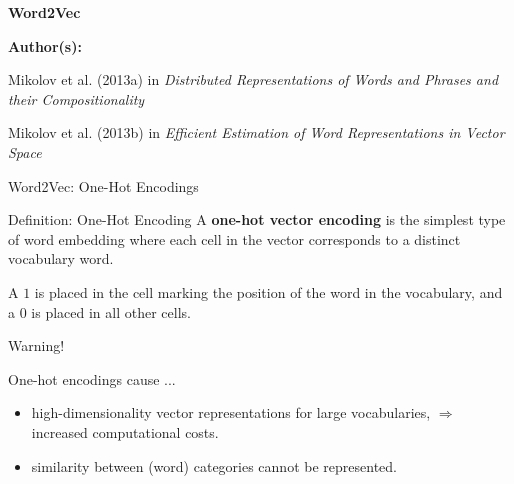 
\begin{frame}{}
    \begin{center}
        \large \textbf{Word2Vec}
    \end{center}
    \vspace{20pt}
    
    \textbf{Author(s):}
    \begin{itemizeSpaced}{5pt}
    {\color{DimGrey} 
        \item Mikolov et al. (2013a) in \emph{Distributed Representations of Words and Phrases and their Compositionality}
        
        \item Mikolov et al. (2013b) in \emph{Efficient Estimation of Word Representations in Vector Space}
    }
    \end{itemizeSpaced}
\end{frame}




\begin{frame}{Word2Vec: One-Hot Encodings}

    \begin{definitionBlock}{Definition: One-Hot Encoding}
    A \textbf{\alert{one-hot vector encoding}} is the simplest type of word embedding where each cell in the vector corresponds to a distinct vocabulary word. \newline 
    
    
    A $1$ is placed in the cell marking the position of the word in the vocabulary, and a $0$ is placed in all other cells.
    \end{definitionBlock}
    
    \begin{alertBlock}{Warning!}
    
    One-hot encodings cause ...
    
    \begin{itemize}
        \item high-dimensionality vector representations for large vocabularies, $\Rightarrow$ increased computational costs.
        
        \item similarity between (word) categories cannot be represented.
    \end{itemize} 
    
    \end{alertBlock}
    
\end{frame}



